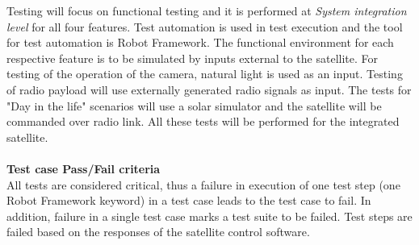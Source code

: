 \documentclass[english,12pt,a4paper,pdftex,elec,utf8]{aaltothesis}
\begin{document}
Testing will focus on functional testing and it is performed at \textit{System integration level} for all four features. Test automation is used in test execution and the tool for test automation is Robot Framework. The functional environment for each respective feature is to be simulated by inputs external to the satellite. For testing of the operation of the camera, natural light is used as an input. Testing of radio payload will use externally generated radio signals as input. The tests for "Day in the life" scenarios will use a solar simulator and the satellite will be commanded over radio link. All these tests will be performed for the integrated satellite.
\\
\\
\textbf{Test case Pass/Fail criteria} 
\\
All tests are considered critical, thus a failure in execution of one test step (one Robot Framework keyword) in a test case leads to the test case to fail. In addition, failure in a single test case marks a test suite to be failed. Test steps are failed based on the responses of the satellite control software. 


\end{document}

